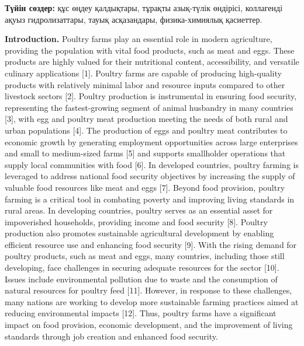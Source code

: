 {\bfseries Түйін сөздер:} құс өңдеу қалдықтары, тұрақты азық-түлік
өндірісі, коллагенді ақуыз гидролизаттары, тауық асқазандары,
физика-химиялық қасиеттер.

\begin{multicols}{2}
{\bfseries Introduction.} Poultry farms play an essential role in modern
agriculture, providing the population with vital food products, such as
meat and eggs. These products are highly valued for their nutritional
content, accessibility, and versatile culinary applications {[}1{]}.
Poultry farms are capable of producing high-quality products with
relatively minimal labor and resource inputs compared to other livestock
sectors {[}2{]}. Poultry production is instrumental in ensuring food
security, representing the fastest-growing segment of animal husbandry
in many countries {[}3{]}, with egg and poultry meat production meeting
the needs of both rural and urban populations {[}4{]}. The production of
eggs and poultry meat contributes to economic growth by generating
employment opportunities across large enterprises and small to
medium-sized farms {[}5{]} and supports smallholder operations that
supply local communities with food {[}6{]}. In developed countries,
poultry farming is leveraged to address national food security
objectives by increasing the supply of valuable food resources like meat
and eggs {[}7{]}. Beyond food provision, poultry farming is a critical
tool in combating poverty and improving living standards in rural areas.
In developing countries, poultry serves as an essential asset for
impoverished households, providing income and food security {[}8{]}.
Poultry production also promotes sustainable agricultural development by
enabling efficient resource use and enhancing food security {[}9{]}.
With the rising demand for poultry products, such as meat and eggs, many
countries, including those still developing, face challenges in securing
adequate resources for the sector {[}10{]}. Issues include environmental
pollution due to waste and the consumption of natural resources for
poultry feed {[}11{]}. However, in response to these challenges, many
nations are working to develop more sustainable farming practices aimed
at reducing environmental impacts {[}12{]}. Thus, poultry farms have a
significant impact on food provision, economic development, and the
improvement of living standards through job creation and enhanced food
security.


\end{multicols}
